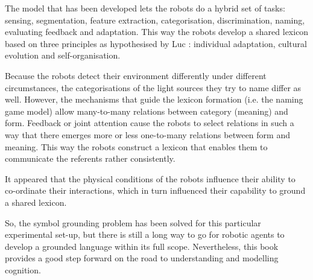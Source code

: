 The model that has been developed lets the robots do a hybrid set of tasks: sensing, segmentation, feature extraction, categorisation, discrimination, naming, evaluating feedback and adaptation. This way the robots develop a shared lexicon based on three principles as hypothesised by Luc \citet{steels:1996a}: individual adaptation, cultural evolution and self-organisation. 

Because the robots detect their environment differently under different circumstances, the categorisations of the light sources they try to name differ as well. However, the mechanisms that guide the lexicon formation (i.e. the naming game model) allow many-to-many relations between category (meaning) and form. Feedback or joint attention cause the robots to select relations in such a way that there emerges more or less one-to-many relations between form and meaning. This way the robots construct a lexicon that enables them to communicate the referents rather consistently. 

It appeared that the physical conditions of the robots influence their ability to co-ordinate their interactions, which in turn influenced their capability to ground a shared lexicon.

So, the symbol grounding problem has been solved for this particular experimental set-up, but there is still a long way to go for robotic agents to develop a grounded language within its full scope. Nevertheless, this book provides a good step forward on the road to understanding and modelling cognition.